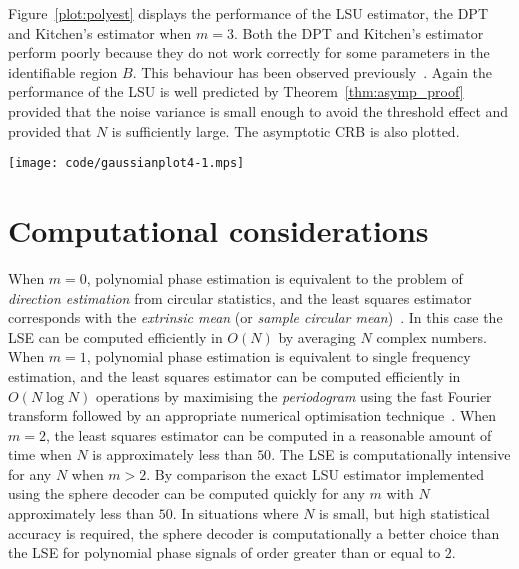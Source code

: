 \documentclass[journal]{IEEEtran}
\begin{document}
Figure~\ref{plot:polyest} displays the performance of the LSU estimator, the DPT and Kitchen's estimator when $m=3$. Both the DPT and Kitchen's estimator perform poorly because they do not work correctly for some parameters in the identifiable region $B$. This behaviour has been observed previously~\cite{McKilliam2009IndentifiabliltyAliasingPolyphase,McKilliam_polyphase_est_icassp_2011}. Again the performance of the LSU is well predicted by Theorem~\ref{thm:asymp_proof} provided that the noise variance is small enough to avoid the threshold effect and provided that $N$ is sufficiently large.  The asymptotic CRB is also plotted.
 
\begin{figure*}[p] 
   	\centering 
  		\texttt{[image: code/gaussianplot4-1.mps]} 
  		\caption{Mean square error (MSE) of polynomial phase estimators for $N=10,50$ and $200$ versus the variance $\sigma_c^2$ of the complex noise terms $X_1, \dots X_N$. The polynomial phase signal has order 3, and the $X_1, \dots, X_N$ are independent and identically distributed complex Gaussian random variables. (Top left) MSE in the phase coefficient $\mu_0$.  (Top right) MSE in the frequency coefficient $\mu_1$.  (Bottom left) MSE in the quadratic coefficient $\mu_2$.  (Bottom right) MSE in the cubic coefficient $\mu_3$.} 
  		\label{plot:polyest} 
 \end{figure*} 

\section{Computational considerations}

When $m=0$, polynomial phase estimation is equivalent to the problem of \emph{direction estimation} from circular statistics, and the least squares estimator corresponds with the \emph{extrinsic mean} (or \emph{sample circular mean})~\cite{McKilliam_mean_dir_est_sq_arc_length2010,Fisher1993,Mardia_directional_statistics}.  In this case the LSE can be computed efficiently in $O(N)$ by averaging $N$ complex numbers.  When $m=1$, polynomial phase estimation is equivalent to single frequency estimation, and the least squares estimator can be computed efficiently in $O(N\log N)$ operations by maximising the \emph{periodogram} using the fast Fourier transform followed by an appropriate numerical optimisation technique~\cite{Quinn2008maximizing_the_periodogram,Rife1974,Quinn2001}.  When $m=2$, the least squares estimator can be computed in a reasonable amount of time when $N$ is approximately less than $50$.  The LSE is computationally intensive for any $N$ when $m > 2$. By comparison the exact LSU estimator implemented using the sphere decoder can be computed quickly for any $m$ with $N$ approximately less than $50$.  In situations where $N$ is small, but high statistical accuracy is required, the sphere decoder is computationally a better choice than the LSE for polynomial phase signals of order greater than or equal to $2$. 
\end{document}
